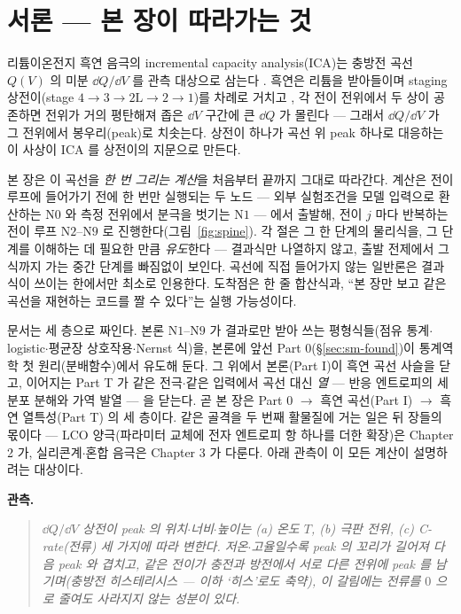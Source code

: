 \section*{서론 --- 본 장이 따라가는 것}

리튬이온전지 흑연 음극의 incremental capacity analysis(ICA)는 충방전 곡선 $Q(V)$ 의 미분
$\dd Q/\dd V$ 를 관측 대상으로 삼는다 \cite{bloom2005,dubarry2012}. 흑연은 리튬을 받아들이며 staging
상전이(stage $4\!\to\!3\!\to\!2\mathrm L\!\to\!2\!\to\!1$)를 차례로 거치고 \cite{dahn1991,ohzuku1993}, 각 전이
전위에서 두 상이 공존하면 전위가 거의 평탄해져 좁은 $\dd V$ 구간에 큰 $\dd Q$ 가 몰린다 --- 그래서
$\dd Q/\dd V$ 가 그 전위에서 봉우리(peak)로 치솟는다. 상전이 하나가 곡선 위 peak 하나로 대응하는 이
사상이 ICA 를 상전이의 지문으로 만든다.

본 장은 이 곡선을 \emph{한 번 그리는 계산}을 처음부터 끝까지 그대로 따라간다. 계산은 전이 루프에 들어가기 전에
한 번만 실행되는 두 노드 --- 외부 실험조건을 모델 입력으로 환산하는 $\mathrm N0$ 와 측정 전위에서 분극을 벗기는
$\mathrm N1$ --- 에서 출발해, 전이 $j$ 마다 반복하는 전이 루프 $\mathrm N2$--$\mathrm N9$ 로 진행한다(그림~\ref{fig:spine}). 각 절은 그 한 단계의 물리식을, 그 단계를
이해하는 데 필요한 만큼 \emph{유도}한다 --- 결과식만 나열하지 않고, 출발 전제에서 그 식까지 가는 중간
단계를 빠짐없이 보인다. 곡선에 직접 들어가지 않는 일반론은 결과식이 쓰이는 한에서만 최소로 인용한다.
도착점은 한 줄 합산식과, ``본 장만 보고 같은 곡선을 재현하는 코드를 짤 수 있다''는 실행 가능성이다.

문서는 세 층으로 짜인다. 본론 $\mathrm N1$--$\mathrm N9$ 가 결과로만 받아 쓰는 평형식들(점유 통계$\cdot$
logistic$\cdot$평균장 상호작용$\cdot$Nernst 식)을, 본론에 앞선 Part 0(\S\ref{sec:sm-found})이 통계역학 첫
원리(분배함수)에서 유도해 둔다. 그 위에서 본론(Part I)이 흑연 곡선 사슬을 닫고, 이어지는 Part T 가 같은
전극$\cdot$같은 입력에서 곡선 대신 \emph{열} --- 반응 엔트로피의 세 분포 분해와 가역 발열 --- 을 닫는다.
곧 본 장은 Part 0 $\to$ 흑연 곡선(Part I) $\to$ 흑연 열특성(Part T) 의 세 층이다. 같은 골격을 두 번째
활물질에 거는 일은 뒤 장들의 몫이다 --- LCO 양극(파라미터 교체에 전자 엔트로피 항 하나를 더한 확장)은
Chapter 2 가, 실리콘계$\cdot$혼합 음극은 Chapter 3 가 다룬다. 아래 관측이 이 모든 계산이 설명하려는 대상이다.

\textbf{관측.}
\begin{quote}\itshape
$\dd Q/\dd V$ 상전이 peak 의 위치$\cdot$너비$\cdot$높이는 (a) 온도 $T$, (b) 극판 전위, (c) C-rate(전류)
세 가지에 따라 변한다. 저온$\cdot$고율일수록 peak 의 꼬리가 길어져 다음 peak 와 겹치고, 같은 전이가 충전과 방전에서
서로 다른 전위에 peak 를 남기며(충방전 히스테리시스 --- 이하 `히스'로도 축약), 이 갈림에는 전류를 $0$ 으로 줄여도 사라지지 않는 성분이 있다.
\end{quote}

